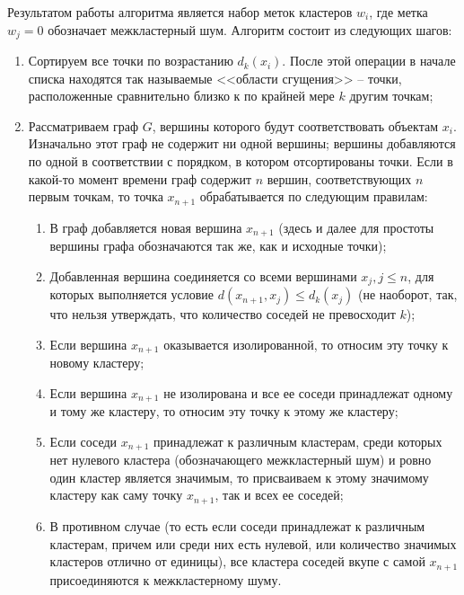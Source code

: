 Результатом работы алгоритма является набор меток кластеров $w_i$, где метка $w_j = 0$ обозначает межкластерный шум. Алгоритм состоит из следующих шагов:
\begin{enumerate}
\item
    Сортируем все точки по возрастанию $d_k(x_i)$. После этой операции в начале списка находятся так называемые <<области сгущения>> -- точки, расположенные сравнительно близко к по крайней мере $k$ другим точкам;
\item
    Рассматриваем граф $G$, вершины которого будут соответствовать объектам $x_i$.
    Изначально этот граф не содержит ни одной вершины; вершины добавляются по одной в соответствии с порядком, в котором отсортированы точки.
    Если в какой-то момент времени граф содержит $n$ вершин, соответствующих $n$ первым точкам, то точка $x_{n+1}$ обрабатывается по следующим правилам:
    \begin{enumerate}
    \item
        В граф добавляется новая вершина $x_{n+1}$ (здесь и далее для простоты вершины графа обозначаются так же, как и исходные точки);
    \item
        Добавленная вершина соединяется со всеми вершинами $x_{j}, j \leq n$, для которых выполняется условие $d\left( x_{n+1}, x_j \right) \leq d_k\left( x_j \right)$ (не наоборот, так, что нельзя утверждать, что количество соседей не превосходит $k$);
    \item
        Если вершина $x_{n+1}$ оказывается изолированной, то относим эту точку к новому кластеру;
    \item
        Если вершина $x_{n+1}$ не изолирована и все ее соседи принадлежат одному и тому же кластеру, то относим эту точку к этому же кластеру;
    \item
        Если соседи $x_{n+1}$ принадлежат к различным кластерам, среди которых нет нулевого кластера (обозначающего межкластерный шум) и ровно один кластер является значимым, то присваиваем к этому значимому кластеру как саму точку $x_{n+1}$, так и всех ее соседей;
    \item
        В противном случае (то есть если соседи принадлежат к различным кластерам, причем или среди них есть нулевой, или количество значимых кластеров отлично от единицы),  %
        все кластера соседей вкупе с самой $x_{n+1}$ присоединяются к межкластерному шуму.
    \end{enumerate}
\end{enumerate}



